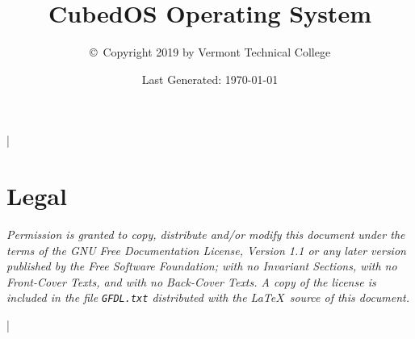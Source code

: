 \documentclass{scrreprt}
\begin{document}
\title{CubedOS Operating System}
\author{\copyright\ Copyright 2019 by Vermont Technical College}
\date{Last Generated: \today}
\maketitle

\tableofcontents

\lstMakeShortInline|

\section*{Legal}
\label{sec:legal}

\textit{Permission is granted to copy, distribute and/or modify this document under the terms of
  the GNU Free Documentation License, Version 1.1 or any later version published by the Free
  Software Foundation; with no Invariant Sections, with no Front-Cover Texts, and with no
  Back-Cover Texts. A copy of the license is included in the file \texttt{GFDL.txt} distributed
  with the \LaTeX\ source of this document.}






\newpage


\lstDeleteShortInline|




\end{document}
